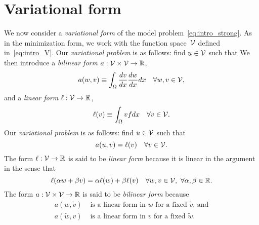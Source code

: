 \section{Variational form}
We now consider a \emph{variational form} of the model problem~\eqref{eq:intro_strong}. As in the minimization form, we work with the function space~$\mathcal{V}$ defined in~\eqref{eq:intro_V}. Our \emph{variational problem} is as follows: find $u \in \mathcal{V}$ such that
We then introduce a \emph{bilinear form} $a: \mathcal{V} \times \mathcal{V} \to \mathbb{R}$,
\begin{equation}
  a(w,v) \equiv \int_{\Omega} \frac{d v}{d x} \frac{d w}{d x} dx \quad \forall w, v \in \mathcal{V},
  \label{eq:intro_a}
\end{equation}
and a \emph{linear form} $\ell: \mathcal{V} \to \mathbb{R}$,
\begin{equation}
  \ell(v) \equiv \int_{\Omega} v f dx \quad \forall v \in \mathcal{V}.
  \label{eq:intro_ell}
\end{equation}
Our \emph{variational problem} is as follows: find $u \in \mathcal{V}$ such that
\begin{equation}
  a(u,v) = \ell(v) \quad \forall v \in \mathcal{V}.
  \label{eq:intro_var}
\end{equation}
The form $\ell: \mathcal{V} \to \mathbb{R}$ is said to be \emph{linear form} because it is linear in the argument in the sense that
\begin{equation*}
  \ell(\alpha w + \beta v) = \alpha \ell(w) + \beta \ell(v) \quad \forall w,v \in \mathcal{V}, \ \forall \alpha, \beta \in \mathbb{R}.
\end{equation*}
The form $a: \mathcal{V} \times \mathcal{V} \to \mathbb{R}$ is said to be \emph{bilinear form} because 
\begin{align*}
  a(w, \tilde v) & \text{ is a linear form in $w$ for a fixed $\tilde v$, and} \\
  a(\tilde w, v) & \text{ is a linear form in $v$ for a fixed $\tilde w$}.
\end{align*}

